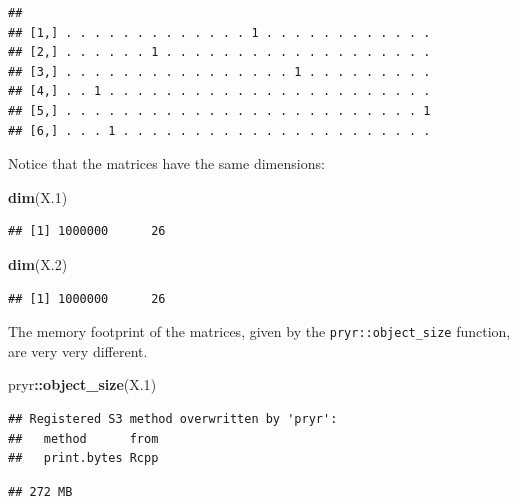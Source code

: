 \documentclass[]{book}
\newenvironment{Shaded}{\begin{snugshade}}{\end{snugshade}}
\newcommand{\FloatTok}[1]{\textcolor[rgb]{0.00,0.00,0.81}{#1}}
\newcommand{\KeywordTok}[1]{\textcolor[rgb]{0.13,0.29,0.53}{\textbf{#1}}}
\newcommand{\NormalTok}[1]{#1}
\newcommand{\OperatorTok}[1]{\textcolor[rgb]{0.81,0.36,0.00}{\textbf{#1}}}
\theoremstyle{definition}
\theoremstyle{definition}
\theoremstyle{definition}
\theoremstyle{remark}
\begin{document}
\begin{verbatim}
##                                                         
## [1,] . . . . . . . . . . . . . 1 . . . . . . . . . . . .
## [2,] . . . . . . 1 . . . . . . . . . . . . . . . . . . .
## [3,] . . . . . . . . . . . . . . . . 1 . . . . . . . . .
## [4,] . . 1 . . . . . . . . . . . . . . . . . . . . . . .
## [5,] . . . . . . . . . . . . . . . . . . . . . . . . . 1
## [6,] . . . 1 . . . . . . . . . . . . . . . . . . . . . .
\end{verbatim}

Notice that the matrices have the same dimensions:

\begin{Shaded}
\begin{Highlighting}[]
\KeywordTok{dim}\NormalTok{(X}\FloatTok{.1}\NormalTok{)}
\end{Highlighting}
\end{Shaded}

\begin{verbatim}
## [1] 1000000      26
\end{verbatim}

\begin{Shaded}
\begin{Highlighting}[]
\KeywordTok{dim}\NormalTok{(X}\FloatTok{.2}\NormalTok{)}
\end{Highlighting}
\end{Shaded}

\begin{verbatim}
## [1] 1000000      26
\end{verbatim}

The memory footprint of the matrices, given by the \texttt{pryr::object\_size} function, are very very different.

\begin{Shaded}
\begin{Highlighting}[]
\NormalTok{pryr}\OperatorTok{::}\KeywordTok{object_size}\NormalTok{(X}\FloatTok{.1}\NormalTok{)}
\end{Highlighting}
\end{Shaded}

\begin{verbatim}
## Registered S3 method overwritten by 'pryr':
##   method      from
##   print.bytes Rcpp
\end{verbatim}

\begin{verbatim}
## 272 MB
\end{verbatim}
\end{document}

